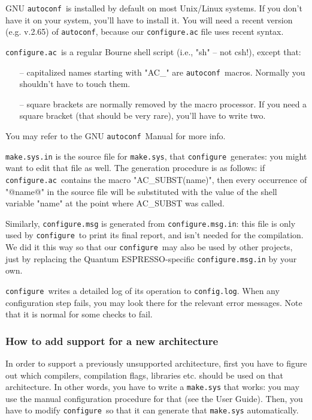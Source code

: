 \documentclass[12pt,a4paper]{article}
\def\qe{{\sc Quantum ESPRESSO}}
\def\configure{\texttt{configure}}
\def\configurac{\texttt{configure.ac}}
\def\autoconf{\texttt{autoconf}}
\begin{document}
GNU \autoconf\ is installed by default on most Unix/Linux systems.  If
you don't have it on your system, you'll have to install it. You will
need a recent version (e.g. v.2.65) of \autoconf, because our \configurac
file uses recent syntax.

\configurac\ is a regular Bourne shell script (i.e., "sh" -- not csh!), 
except that:
\begin{itemize}
\item[--] capitalized names starting with "AC\_" are \autoconf\ macros.  Normally you shouldn't have to touch them.
\item[--] square brackets are normally removed by the macro processor.  If you need a square bracket (that should be very rare), you'll have to write two.
\end{itemize}

You may refer to the GNU \autoconf\ Manual for more info.

\texttt{make.sys.in} is the source file for \texttt{make.sys}, that
\configure\ generates: you might want to edit that file as well. 
The generation procedure is as follows: if \configurac\ contains the macro
"AC\_SUBST(name)", then every occurrence of "@name@" in the source
file will be substituted with the value of the shell variable "name"
at the point where AC\_SUBST was called.

Similarly, \configure\texttt{.msg} is generated from \configure\texttt{.msg.in}: this
file is only used by \configure\ to print its final report, and isn't
needed for the compilation.  We did it this way so that our
\configure\ may also be used by other projects, just by replacing the
\qe-specific \configure\texttt{.msg.in} by your own.

\configure\ writes a detailed log of its operation to \texttt{config.log}.
When any configuration step fails, you may look there for the relevant
error messages.  Note that it is normal for some checks to fail.

\subsubsection{How to add support for a new architecture}

In order to support a previously unsupported architecture, first you
have to figure out which compilers, compilation flags, libraries
etc. should be used on that architecture.
In other words, you have to write a \texttt{make.sys} that works: you may use
the manual configuration procedure for that (see the 
User Guide).  Then, you have to modify \configure\ so that it can
generate that \texttt{make.sys} automatically.
\end{document}
